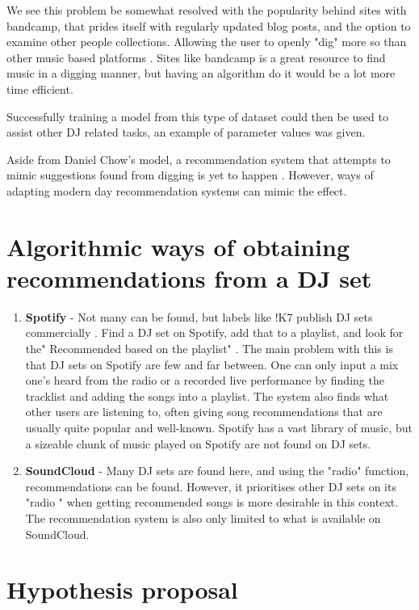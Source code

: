 We see this problem be somewhat resolved with the popularity behind sites with bandcamp, that prides itself with regularly updated blog posts, and the option to examine other people collections. Allowing the user to openly "dig" more so than other music based platforms \citep{bandcamp_about_2023}.  Sites like bandcamp is a great resource to find music in a digging manner, but having an algorithm do it would be a lot more time efficient. 

Successfully training a model from this type of dataset could then be used to assist other DJ related tasks, an example of parameter values was given.

Aside from Daniel Chow's model, a recommendation system that attempts to mimic suggestions found from digging is yet to happen \citep{chow_music_2020}. However, ways of adapting modern day recommendation systems can mimic the effect.

\section{Algorithmic ways of obtaining recommendations from a DJ set}
\begin{enumerate}
	\item \textbf{Spotify }- Not many can be found, but labels like !K7 publish DJ sets commercially \citep{k7_about_2023}.  Find a DJ set on Spotify, add that to a playlist, and look for the"
	Recommended based on the playlist" . The main problem with this is that DJ sets on Spotify are few and far between. One can only input a mix one’s heard from the radio or a recorded live performance by finding the tracklist and adding the songs into a playlist. The system also finds what other users are listening to, often giving song recommendations that are usually quite popular and well-known. Spotify has a vast library of music, but a sizeable chunk of music played on Spotify are not found on DJ sets.
	
	\item \textbf{SoundCloud }- Many DJ sets are found here, and using the "radio" function, recommendations can be found. However, it prioritises other DJ sets on its "radio " when getting recommended songs is more desirable in this context. The recommendation system is also only limited to what is available on SoundCloud.
	
\end{enumerate}

\section{Hypothesis proposal}
	
